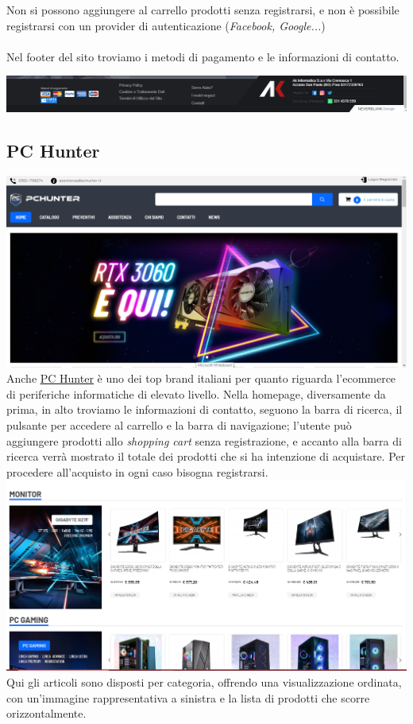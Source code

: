 \documentclass{article}
\begin{document}
\begin{large}
Non si possono aggiungere al carrello prodotti senza registrarsi, e non è possibile registrarsi con un provider di autenticazione (\textit{Facebook, Google...}) \\ \\


Nel footer del sito troviamo i metodi di pagamento e le informazioni di contatto.
\begin{center}
\includegraphics[scale=0.45]{akinformatica/ak2.png}
\end{center}
\subsection{PC Hunter}
\includegraphics[scale=0.45]{pchunter/pchunter1.png}
Anche \href{https://www.pchunter.it/}{\underline{PC Hunter}} è uno dei top brand italiani per quanto riguarda l'ecommerce di periferiche informatiche di elevato livello. Nella homepage, diversamente da prima, in alto troviamo le informazioni di contatto, seguono la barra di ricerca, il pulsante per accedere al carrello e la barra di navigazione; l'utente può aggiungere prodotti allo \textit{shopping cart} senza registrazione, e accanto alla barra di ricerca verrà mostrato il totale dei prodotti che si ha intenzione di acquistare. Per procedere all'acquisto in ogni caso bisogna registrarsi.\\
\includegraphics[scale=0.40]{pchunter/pchunter2.png}
Qui gli articoli sono disposti per categoria, offrendo una visualizzazione ordinata, con un'immagine rappresentativa a sinistra e la lista di prodotti che scorre orizzontalmente.

\end{large}
\end{document}

